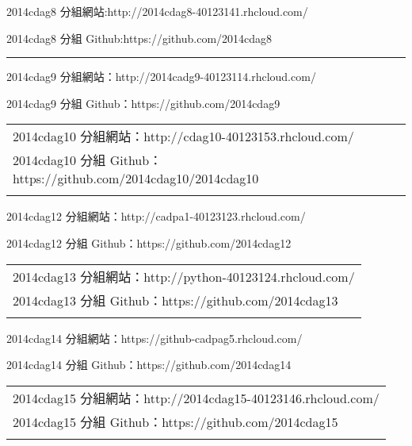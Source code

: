 \documentclass[]{article}
\begin{document}
2014cdag8 分組網站:http://2014cdag8-40123141.rhcloud.com/

2014cdag8 分組 Github:https://github.com/2014cdag8

\begin{center}\rule{3in}{0.4pt}\end{center}

2014cdag9 分組網站：http://2014cadg9-40123114.rhcloud.com/

2014cdag9 分組 Github：https://github.com/2014cdag9

\begin{longtable}[c]{@{}l@{}}
\toprule\addlinespace
\begin{minipage}[t]{0.09\columnwidth}\raggedright
2014cdag10 分組網站：http://cdag10-40123153.rhcloud.com/
\end{minipage}
\\\addlinespace
\begin{minipage}[t]{0.09\columnwidth}\raggedright
2014cdag10 分組 Github：https://github.com/2014cdag10/2014cdag10
\end{minipage}
\\\addlinespace
\bottomrule
\end{longtable}

2014cdag12 分組網站：http://cadpa1-40123123.rhcloud.com/

2014cdag12 分組 Github：https://github.com/2014cdag12

\begin{longtable}[c]{@{}l@{}}
\toprule\addlinespace
\begin{minipage}[t]{0.09\columnwidth}\raggedright
2014cdag13 分組網站：http://python-40123124.rhcloud.com/
\end{minipage}
\\\addlinespace
\begin{minipage}[t]{0.09\columnwidth}\raggedright
2014cdag13 分組 Github：https://github.com/2014cdag13
\end{minipage}
\\\addlinespace
\bottomrule
\end{longtable}

2014cdag14 分組網站：https://github-cadpag5.rhcloud.com/

2014cdag14 分組 Github：https://github.com/2014cdag14

\begin{longtable}[c]{@{}l@{}}
\toprule\addlinespace
\begin{minipage}[t]{0.09\columnwidth}\raggedright
2014cdag15 分組網站：http://2014cdag15-40123146.rhcloud.com/
\end{minipage}
\\\addlinespace
\begin{minipage}[t]{0.09\columnwidth}\raggedright
2014cdag15 分組 Github：https://github.com/2014cdag15
\end{minipage}
\\\addlinespace
\bottomrule
\end{longtable}
\end{document}
